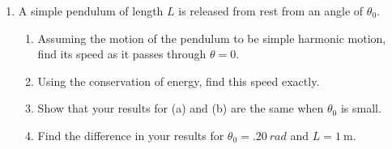 \documentclass{../../../oss-apphys}
\begin{document}
\begin{enumerate}[leftmargin=15pt]
\item A simple pendulum of length $L$ is released from rest from an angle of
  $\theta_0$.
  \begin{enumerate}[itemsep=.8in,topsep=0pt,leftmargin=15pt]
  \item Assuming the motion of the pendulum to be simple harmonic motion, find
    its speed as it passes through $\theta=0$.
  \item Using the conservation of energy, find this speed exactly.
  \item Show that your results for (a) and (b) are the same when $\theta_0$ is
    small.
  \item Find the difference in your results for $\theta_0=\SI{.20}{rad}$ and
    $L=\SI{1}{\metre}$.
  \end{enumerate}
 
\end{enumerate}
\end{document}
